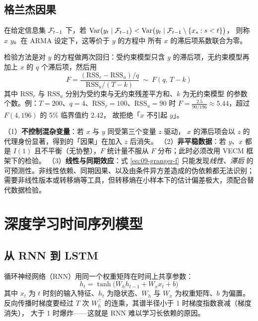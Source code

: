 \subsection{格兰杰因果}

\begin{definition}\label{def:09-granger}
在给定信息集 $\mathcal{F}_{t-1}$ 下，若
$\operatorname{Var}\bigl(y_t\mid \mathcal{F}_{t-1}\bigr)<\operatorname{Var}\bigl(y_t\mid \mathcal{F}_{t-1}\setminus\{x_{s}:s<t\}\bigr)$，
则称 $x$  $y$。在 $\mathrm{ARMA}$ 设定下，这等价于 $y$ 的方程中
所有 $x$ 的滞后项系数联合为零。
\end{definition}

检验方法是对 $y$ 的方程做两次回归：受约束模型只含 $y$ 的滞后项，无约束模型再加上
$x$ 的 $q$ 个滞后项，然后用
\begin{equation}\label{eq:09-granger-f}
  F=\frac{(\mathrm{RSS}_r-\mathrm{RSS}_u)/q}{\mathrm{RSS}_u/(T-k)}\ \sim\ F(q,\,T-k)
\end{equation}
其中 $\mathrm{RSS}_r$ 与 $\mathrm{RSS}_u$ 分别为受约束与无约束残差平方和、$k$ 为无约束模型
的参数个数。例：$T=200$、$q=4$、$\mathrm{RSS}_r=100$、$\mathrm{RSS}_u=90$ 时
$F=\frac{2.5}{90/196}\approx 5.44$，超过 $F(4,196)$ 的 5\% 临界值约 $2.42$，
故拒绝「$x$ 不引起 $y$」。

\begin{warningbox}[格兰杰因果的三条使用禁忌]
（1）\textbf{不控制混杂变量}：若 $x$ 与 $y$ 同受第三个变量 $z$ 驱动，
$x$ 的滞后项会以 $z$ 的代理身份显著，得到的「因果」在加入 $z$ 后消失。
（2）\textbf{非平稳数据}：若 $y$、$x$ 都是 $I(1)$ 且不平衡（无协整），$F$ 统计量不服从
$F$ 分布；此时必须改用 VECM 框架下的检验。
（3）\textbf{线性与同期效应}：式 \eqref{eq:09-granger-f} 只能发现\emph{线性、滞后}
的可预测性。非线性依赖、同期因果、以及由条件异方差造成的伪依赖都无法识别；
需要非线性版本或转移熵等工具，但转移熵在小样本下的估计偏差极大，须配合替代数据检验。
\end{warningbox}

\section{深度学习时间序列模型}

\subsection{从 RNN 到 LSTM}

循环神经网络（RNN）用同一个权重矩阵在时间上共享参数：
\begin{equation}\label{eq:09-rnn}
  h_t=\tanh\bigl(W_hh_{t-1}+W_xx_t+b\bigr)
\end{equation}
其中 $x_t$ 为 $t$ 时刻的输入特征、$h_t$ 为隐状态、$W_h$ 与 $W_x$ 为权重矩阵、$b$ 为偏置。
反向传播时梯度要经过 $T$ 次 $W_h^{\top}$ 的连乘，其谱半径小于 1 时梯度指数衰减（梯度消失），
大于 1 时爆炸——这就是 RNN 难以学习长依赖的原因。

